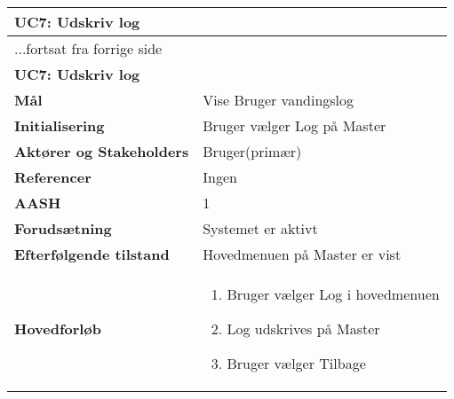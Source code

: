 \begin{center} \centering \label{UC7}
	\begin{longtable}{|p{5cm}|p{9cm}|}  %
	\hline
		\multicolumn{2}{|l|}{\textbf{UC7: Udskriv log}} \\\hline %
		\endfirsthead
		
		\multicolumn{2}{l}{...fortsat fra forrige side} \\ \hline %
		\multicolumn{2}{|l|}{\textbf{UC7: Udskriv log}} \\\hline %
		\endhead	
		
		\textbf{Mål}								&Vise Bruger vandingslog			\\\hline
		\textbf{Initialisering}					&Bruger vælger Log på Master	\\\hline
		\textbf{Aktører og Stakeholders}			&Bruger(primær)			\\\hline
		\textbf{Referencer}						&Ingen					\\\hline
		\textbf{AASH}							&1						\\\hline
		\textbf{Forudsætning}					&Systemet er aktivt		\\\hline
		\textbf{Efterfølgende tilstand}			&Hovedmenuen på Master er vist			\\\hline
		\textbf{Hovedforløb}					
			&\begin{enumerate}
	
				\item Bruger vælger Log i hovedmenuen 
				
				\item Log udskrives på Master
				
				\item Bruger vælger Tilbage
	
			\end{enumerate}\\\hline
	\end{longtable} 
\end{center}

